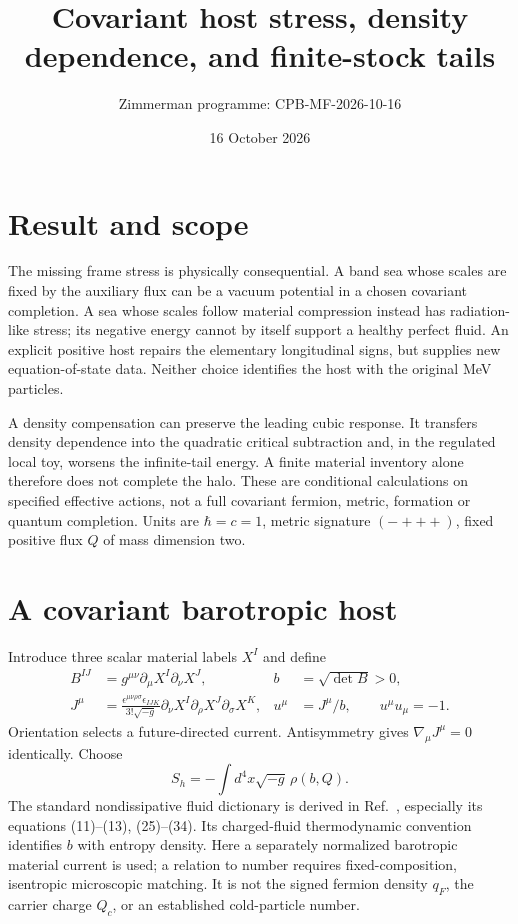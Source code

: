 \documentclass[11pt]{article}
\title{Covariant host stress, density dependence, and finite-stock tails}
\author{Zimmerman programme: CPB-MF-2026-10-16}
\date{16 October 2026}
\begin{document}
\maketitle
\section{Result and scope}
The missing frame stress is physically consequential. A band sea whose scales
are fixed by the auxiliary flux can be a vacuum potential in a chosen
covariant completion. A sea whose scales follow material compression instead
has radiation-like stress; its negative energy cannot by itself support a
healthy perfect fluid. An explicit positive host repairs the elementary
longitudinal signs, but supplies new equation-of-state data. Neither choice
identifies the host with the original MeV particles.

A density compensation can preserve the leading cubic response. It transfers
density dependence into the quadratic critical subtraction and, in the
regulated local toy, worsens the infinite-tail energy. A finite material
inventory alone therefore does not complete the halo. These are conditional
calculations on specified effective actions, not a full covariant fermion,
metric, formation or quantum completion. Units are $\hbar=c=1$, metric
signature $(-+++)$, fixed positive flux $Q$ of mass dimension two.

\section{A covariant barotropic host}
Introduce three scalar material labels $X^I$ and define
\begin{align}
 B^{IJ}&=g^{\mu\nu}\partial_\mu X^I\partial_\nu X^J,&
 b&=\sqrt{\det B}>0,\\
 J^\mu&=\frac{\epsilon^{\mu\nu\rho\sigma}\epsilon_{IJK}}
 {3!\sqrt{-g}}\partial_\nu X^I\partial_\rho X^J\partial_\sigma X^K,
 &u^\mu&=J^\mu/b,\qquad u^\mu u_\mu=-1.
\end{align}
Orientation selects a future-directed current. Antisymmetry gives
$\nabla_\mu J^\mu=0$ identically. Choose
\begin{equation}
 S_h=-\int d^4x\sqrt{-g}\,\rho(b,Q).
\end{equation}
The standard nondissipative fluid dictionary is derived in
Ref.~\cite{MFfluid}, especially its equations (11)--(13), (25)--(34).
Its charged-fluid thermodynamic convention identifies $b$ with entropy
density. Here a separately normalized barotropic material current is used;
a relation to number requires fixed-composition, isentropic microscopic
matching. It is not the signed fermion density $q_F$, the carrier charge
$Q_c$, or an established cold-particle number.
\end{document}
